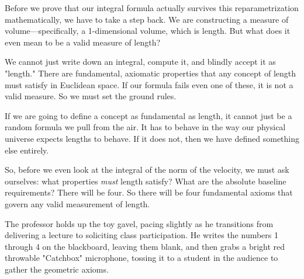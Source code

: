 \begin{spoken-clean}[09:30 - 11:00]
Before we prove that our integral formula actually survives this reparametrization mathematically, we have to take a step back. We are constructing a measure of volume—specifically, a 1-dimensional volume, which is length. But what does it even mean to be a valid measure of length? 

We cannot just write down an integral, compute it, and blindly accept it as "length." There are fundamental, axiomatic properties that any concept of length must satisfy in Euclidean space. If our formula fails even one of these, it is not a valid measure. So we must set the ground rules.
\end{spoken-clean}





\begin{spoken-clean}[11:00 - 12:30]
If we are going to define a concept as fundamental as length, it cannot just be a random formula we pull from the air. It has to behave in the way our physical universe expects lengths to behave. If it does not, then we have defined something else entirely. 

So, before we even look at the integral of the norm of the velocity, we must ask ourselves: what properties \textit{must} length satisfy? What are the absolute baseline requirements? There will be four. So there will be four fundamental axioms that govern any valid measurement of length.
\end{spoken-clean}

\begin{nice-box}
The professor holds up the toy gavel, pacing slightly as he transitions from delivering a lecture to soliciting class participation. He writes the numbers 1 through 4 on the blackboard, leaving them blank, and then grabs a bright red throwable "Catchbox" microphone, tossing it to a student in the audience to gather the geometric axioms.
\end{nice-box}

